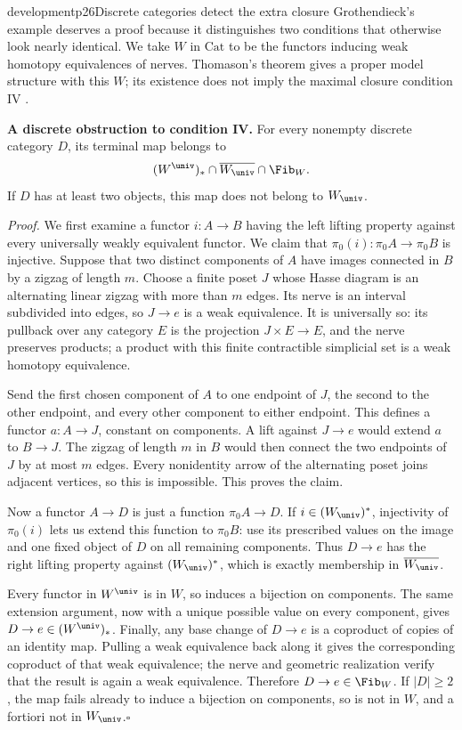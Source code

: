 \begin{dcomment}{development}{p26}{Discrete categories detect the extra closure}
Grothendieck's example deserves a proof because it distinguishes two conditions that otherwise look nearly identical. We take $W$ in $\mathrm{Cat}$ to be the functors inducing weak homotopy equivalences of nerves. Thomason's theorem gives a proper model structure with this $W$; its existence does not imply the maximal closure condition IV \citep[Theorem~4.9 and Corollary~5.5]{Thomason1980}.

\noindent\textbf{A discrete obstruction to condition IV.}\ours\quad
For every nonempty discrete category $D$, its terminal map belongs to
\[
 (W^{\univ})_*\cap\overline{W_{\univ}}\cap\Fib_W.
\]
If $D$ has at least two objects, this map does not belong to $W_{\univ}$.

\emph{Proof.} We first examine a functor $i:A\to B$ having the left lifting property against every universally weakly equivalent functor. We claim that $\pi_0(i):\pi_0A\to\pi_0B$ is injective. Suppose that two distinct components of $A$ have images connected in $B$ by a zigzag of length $m$. Choose a finite poset $J$ whose Hasse diagram is an alternating linear zigzag with more than $m$ edges. Its nerve is an interval subdivided into edges, so $J\to e$ is a weak equivalence. It is universally so: its pullback over any category $E$ is the projection $J\times E\to E$, and the nerve preserves products; a product with this finite contractible simplicial set is a weak homotopy equivalence.

Send the first chosen component of $A$ to one endpoint of $J$, the second to the other endpoint, and every other component to either endpoint. This defines a functor $a:A\to J$, constant on components. A lift against $J\to e$ would extend $a$ to $B\to J$. The zigzag of length $m$ in $B$ would then connect the two endpoints of $J$ by at most $m$ edges. Every nonidentity arrow of the alternating poset joins adjacent vertices, so this is impossible. This proves the claim.

Now a functor $A\to D$ is just a function $\pi_0A\to D$. If $i\in(W_{\univ})^*$, injectivity of $\pi_0(i)$ lets us extend this function to $\pi_0B$: use its prescribed values on the image and one fixed object of $D$ on all remaining components. Thus $D\to e$ has the right lifting property against $(W_{\univ})^*$, which is exactly membership in $\overline{W_{\univ}}$.

Every functor in $W^{\univ}$ is in $W$, so induces a bijection on components. The same extension argument, now with a unique possible value on every component, gives $D\to e\in(W^{\univ})_*$. Finally, any base change of $D\to e$ is a coproduct of copies of an identity map. Pulling a weak equivalence back along it gives the corresponding coproduct of that weak equivalence; the nerve and geometric realization verify that the result is again a weak equivalence. Therefore $D\to e\in\Fib_W$. If $|D|\geq2$, the map fails already to induce a bijection on components, so is not in $W$, and a fortiori not in $W_{\univ}$.\hfill$\square$


\end{dcomment}
